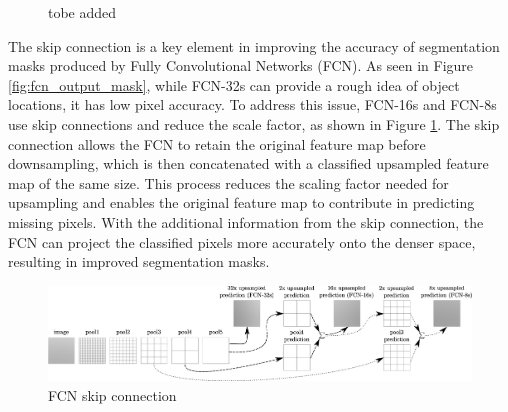 \begin{figure}[!ht]
    \centering

    \caption{{\color{red} tobe added}}
\end{figure}

The skip connection is a key element in improving the accuracy of segmentation masks produced by Fully Convolutional Networks (FCN). As seen in Figure \ref{fig:fcn_output_mask}, while FCN-32s can provide a rough idea of object locations, it has low pixel accuracy. To address this issue, FCN-16s and FCN-8s use skip connections and reduce the scale factor, as shown in Figure \ref{fig:fcn_skip_conn}. The skip connection allows the FCN to retain the original feature map before downsampling, which is then concatenated with a classified upsampled feature map of the same size. This process reduces the scaling factor needed for upsampling and enables the original feature map to contribute in predicting missing pixels. With the additional information from the skip connection, the FCN can project the classified pixels more accurately onto the denser space, resulting in improved segmentation masks.

\begin{figure}[!ht]
    \centering
    \includegraphics[width=6in]{figures/fcn_skip_conn.png}
    \caption{{\color{red} FCN skip connection}}  \label{fig:fcn_skip_conn}
\end{figure}